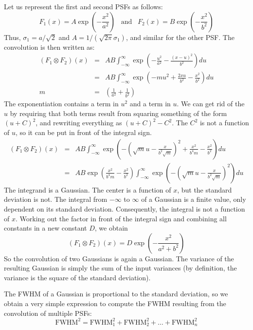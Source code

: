 Let us represent the first and second PSFs as follows:
\begin{equation}
  F_1(x) = A \exp\left( -\frac{x^2}{a^2}\right)  \;\;\; \mbox{and} \;\;\;
  F_2(x) = B \exp\left( -\frac{x^2}{b^2}\right)
\end{equation}
Thus, $\sigma_1 = a / \sqrt{2}$ and $A = 1 / (\sqrt{2 \pi} \sigma_1)$, and
similar for the other PSF. The convolution is then written as:
%
\begin{align}
(F_1 \otimes F_2)(x) & = &
  AB \int_{-\infty}^{\infty} \exp\left(- \frac{u^2}{a^2} - \frac{(x-u)^2}{b^2}\right) du\\
& = & AB \int_{-\infty}^{\infty} \exp\left(- m u^2   + \frac{2xu}{b^2} - \frac{x^2}{b^2}\right)
  du \\
m & = & \left( \frac{1}{a^2} + \frac{1}{b^2}\right)
\end{align}
%
The exponentiation contains a term in $u^2$ and a term in $u$. We can get rid of
the $u$ by requiring that both terms result from squaring something of the
form $(u + C)^2$, and rewriting everything as $(u + C)^2 - C^2$. The $C^2$ is
not a function of $u$, so it can be put in front of the integral sign.
% 
\begin{align}
 (F_1 \otimes F_2)(x)  &  = & AB \int_{-\infty}^{\infty} \exp\left(- \left( \sqrt{m} u 
         - \frac{x}{b^2 \sqrt{m}} \right)^2
       + \frac{x^2}{b^4 m}
       - \frac{x^2}{b^2}\right) du\\
 & = &  AB \exp\left(\frac{x^2}{b^4 m} - \frac{x^2}{b^2}\right)
     \int_{-\infty}^{\infty} \exp\left(- \left( \sqrt{m} u 
         - \frac{x}{b^2 \sqrt{m}} \right)^2\right) du
\end{align}
The integrand is a Gaussian. The center is a function of $x$, but the standard
deviation is not. The integral from $-\infty$ to $\infty$ of a Gaussian is a
finite value, only dependent on its standard deviation. Consequently, the
integral is not a function of $x$. Working out the factor in front of the
integral sign and combining all constants in a new constant $D$, we obtain
%
\begin{equation}
 (F_1 \otimes F_2)(x) =  D \exp\left(-\frac{x^2}{a^2 + b^2}\right)
\end{equation}
%
So the convolution of two Gaussians is again a Gaussian. The variance of the
resulting Gaussian is simply the sum of the input variances (by definition, the
variance is the square of the standard deviation).

The FWHM of a Gaussian is proportional to the standard deviation, so we obtain
a very simple expression to compute the FWHM resulting from the convolution of
multiple PSFs:
\begin{equation}
 \mbox{FWHM}^2 = \mbox{FWHM}_1^2 + \mbox{FWHM}_2^2 + \ldots + \mbox{FWHM}_n^2
\end{equation}

